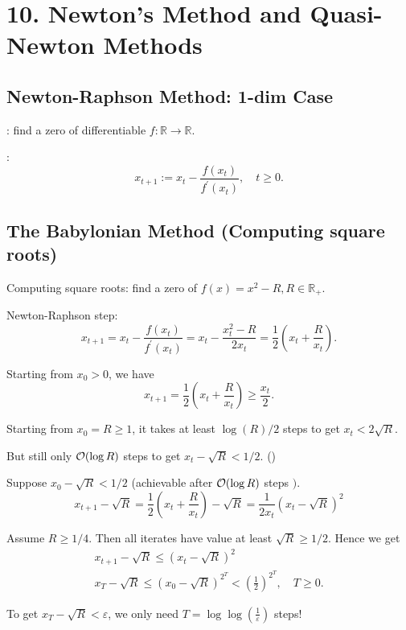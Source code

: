 \section*{10. Newton's Method and Quasi-Newton Methods}
\subsection*{Newton-Raphson Method: 1-dim Case}
: find a zero of differentiable $f: \mathbb{R} \rightarrow \mathbb{R}$.

:
$$
x_{t+1}:=x_{t}-\frac{f\left(x_{t}\right)}{f^{\prime}\left(x_{t}\right)}, \quad t \geq 0 .
$$




\subsection*{The Babylonian Method (Computing square roots)}
Computing square roots: find a zero of $f(x)=x^{2}-R, R \in \mathbb{R}_{+}$.

Newton-Raphson step:
$$
x_{t+1}=x_{t}-\frac{f\left(x_{t}\right)}{f^{\prime}\left(x_{t}\right)}=x_{t}-\frac{x_{t}^{2}-R}{2 x_{t}}=\frac{1}{2}\left(x_{t}+\frac{R}{x_{t}}\right) .
$$

Starting from $x_{0}>0$, we have
$$
x_{t+1}=\frac{1}{2}\left(x_{t}+\frac{R}{x_{t}}\right) \geq \frac{x_{t}}{2} .
$$

Starting from $x_{0}=R \geq 1$, it takes at least $\log (R) / 2$ steps to get $x_{t}<2 \sqrt{R}$.

But still only $\operatorname{\mathcal{O}}(\log R)$ steps to get $x_{t}-\sqrt{R}<1 / 2$. ()

Suppose $x_{0}-\sqrt{R}<1 / 2$ (achievable after $\operatorname{\mathcal{O}}(\log R)$ steps $)$.
$$
x_{t+1}-\sqrt{R}=\frac{1}{2}\left(x_{t}+\frac{R}{x_{t}}\right)-\sqrt{R}=\frac{1}{2 x_{t}}\left(x_{t}-\sqrt{R}\right)^{2}
$$

Assume $R \geq 1 / 4$. Then all iterates have value at least $\sqrt{R} \geq 1 / 2$. Hence we get
$$
\begin{gathered}
x_{t+1}-\sqrt{R} \leq\left(x_{t}-\sqrt{R}\right)^{2} \\
x_{T}-\sqrt{R} \leq\left(x_{0}-\sqrt{R}\right)^{2^{T}}<\left(\frac{1}{2}\right)^{2^{T}}, \quad T \geq 0 .
\end{gathered}
$$

To get $x_{T}-\sqrt{R}<\varepsilon$, we only need $T=\log \log \left(\frac{1}{\varepsilon}\right)$ steps!






